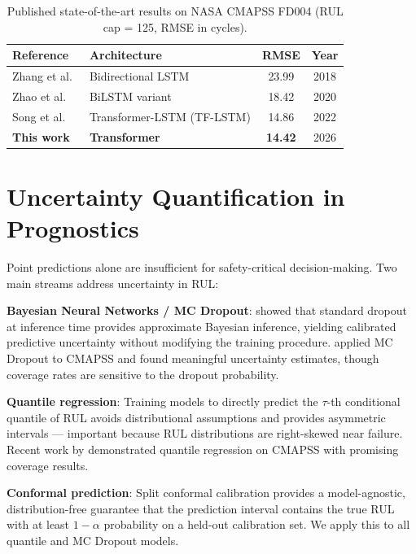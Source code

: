 \documentclass[12pt,a4paper]{report}
\begin{document}
\begin{table}[H]
\centering
\caption{Published state-of-the-art results on NASA CMAPSS FD004 (RUL cap = 125, RMSE in cycles).}
\label{tab:literature}
\begin{tabular}{llcc}
\toprule
\textbf{Reference} & \textbf{Architecture} & \textbf{RMSE} & \textbf{Year} \\
\midrule
Zhang et al.\ \cite{zhang2018blstm}       & Bidirectional LSTM        & 23.99 & 2018 \\
Zhao et al.\ \cite{zhao2020bilstm}        & BiLSTM variant            & 18.42 & 2020 \\
Song et al.\ \cite{song2022transformer}   & Transformer-LSTM (TF-LSTM)& 14.86 & 2022 \\
\midrule
\textbf{This work}                        & \textbf{Transformer}      & \textbf{14.42} & 2026 \\
\bottomrule
\end{tabular}
\end{table}

\section{Uncertainty Quantification in Prognostics}

Point predictions alone are insufficient for safety-critical decision-making. Two main streams address uncertainty in RUL:

\textbf{Bayesian Neural Networks / MC Dropout}: \citet{gal2016dropout} showed that standard dropout at inference time provides approximate Bayesian inference, yielding calibrated predictive uncertainty without modifying the training procedure. \citet{zhu2019estimation} applied MC Dropout to CMAPSS and found meaningful uncertainty estimates, though coverage rates are sensitive to the dropout probability.

\textbf{Quantile regression}: Training models to directly predict the $\tau$-th conditional quantile of RUL \cite{koenker1978quantile} avoids distributional assumptions and provides asymmetric intervals — important because RUL distributions are right-skewed near failure. Recent work by \citet{he2020deep} demonstrated quantile regression on CMAPSS with promising coverage results.

\textbf{Conformal prediction}: Split conformal calibration \cite{angelopoulos2021gentle} provides a model-agnostic, distribution-free guarantee that the prediction interval contains the true RUL with at least $1-\alpha$ probability on a held-out calibration set. We apply this to all quantile and MC Dropout models.
\end{document}
